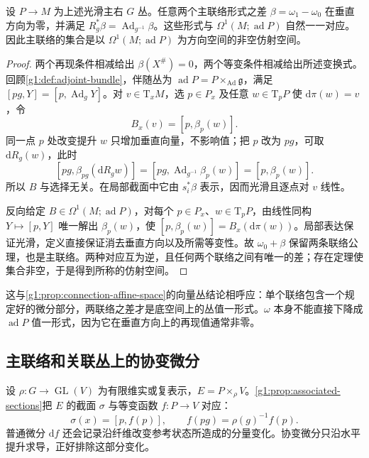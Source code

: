 \begin{proposition}\label{g1:prop:principal-connection-affine}
	设 \(P\to M\) 为上述光滑主右 \(G\) 丛。任意两个主联络形式之差 \(\beta=\omega_1-\omega_0\) 在垂直方向为零，并满足 \(R_g^*\beta=\operatorname{Ad}_{g^{-1}}\beta\)。这些形式与 \(\Omega^1(M;\operatorname{ad}P)\) 自然一一对应。因此主联络的集合是以 \(\Omega^1(M;\operatorname{ad}P)\) 为方向空间的非空仿射空间。
\end{proposition}
\begin{proof}
	两个再现条件相减给出 \(\beta(X^\#)=0\)，两个等变条件相减给出所述变换式。回顾\cref{g1:def:adjoint-bundle}，伴随丛为 \(\operatorname{ad}P=P\times_{\operatorname{Ad}}\mathfrak g\)，满足 \([pg,Y]=[p,\operatorname{Ad}_gY]\)。对 \(v\in \mathrm{T}_xM\)，选 \(p\in P_x\) 及任意 \(w\in \mathrm{T}_pP\) 使 \(\mathrm{d}\pi(w)=v\)，令
	\[
		B_x(v)=[p,\beta_p(w)].
	\]
	同一点 \(p\) 处改变提升 \(w\) 只增加垂直向量，不影响值；把 \(p\) 改为 \(pg\)，可取 \(\mathrm{d}R_g(w)\)，此时
	\[
		[pg,\beta_{pg}(\mathrm{d}R_gw)]
		=[pg,\operatorname{Ad}_{g^{-1}}\beta_p(w)]
		=[p,\beta_p(w)].
	\]
	所以 \(B\) 与选择无关。在局部截面中它由 \(s_i^*\beta\) 表示，因而光滑且逐点对 \(v\) 线性。

	反向给定 \(B\in\Omega^1(M;\operatorname{ad}P)\)，对每个 \(p\in P_x\)、\(w\in \mathrm{T}_pP\)，由线性同构 \(Y\mapsto[p,Y]\) 唯一解出 \(\beta_p(w)\)，使 \([p,\beta_p(w)]=B_x(\mathrm{d}\pi(w))\)。局部表达保证光滑，定义直接保证消去垂直方向以及所需等变性。故 \(\omega_0+\beta\) 保留两条联络公理，也是主联络。两种对应互为逆，且任何两个联络之间有唯一的差；存在定理使集合非空，于是得到所称的仿射空间。
\end{proof}

这与\cref{g1:prop:connection-affine-space}的向量丛结论相呼应：单个联络包含一个规定好的微分部分，两联络之差才是底空间上的丛值一形式。\(\omega\) 本身不能直接下降成 \(\operatorname{ad}P\) 值一形式，因为它在垂直方向上的再现值通常非零。

\subsection{主联络和关联丛上的协变微分}
\label{g1:subsec:1802:04}

设 \(\rho:G\to\operatorname{GL}(V)\) 为有限维实或复表示，\(E=P\times_\rho V\)。\cref{g1:prop:associated-sections}把 \(E\) 的截面 \(\sigma\) 与等变函数 \(f:P\to V\) 对应：
\[
	\sigma(x)=[p,f(p)],\qquad
	f(pg)=\rho(g)^{-1}f(p).
\]
普通微分 \(\mathrm{d}f\) 还会记录沿纤维改变参考状态所造成的分量变化。协变微分只沿水平提升求导，正好排除这部分变化。

